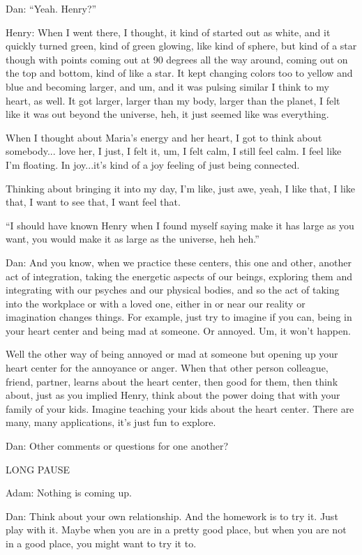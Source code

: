 \documentclass[12pt]{book}
\begin{document}
Dan: “Yeah. Henry?”
					
Henry: When I went there, I thought, it kind of started out as white, and it quickly turned green, kind of green glowing, like kind of sphere, but kind of a star though with points coming out at 90 degrees all the way around, coming out on the top and bottom, kind of like a star. It kept changing colors too to yellow and blue and becoming larger, and um, and it was pulsing similar I think to my heart, as well. It got larger, larger than my body, larger than the planet, I felt like it was out beyond the universe, heh, it just seemed like was everything.
					
When I thought about Maria’s energy and her heart, I got to think about somebody... love her, I just, I felt it, um, I felt calm, I still feel calm. I feel like I’m floating. In joy...it’s kind of a joy feeling of just being connected.

Thinking about bringing it into my day, I’m like, just awe, yeah, I like that, I like that, I want to see that, I want feel that.



``I should have known Henry when I found myself saying make it has large as you want,
you would make it as large as the universe, heh heh.''


Dan: And you know, when we practice these centers, this one and other, another act of integration, taking the energetic aspects of our beings, exploring them and integrating with our psyches and our physical bodies, and so the act of taking into the workplace or with a loved one, either in or near our reality or imagination changes things. For example, just try to imagine if you can, being in your heart center and being mad at someone. Or annoyed. Um, it won’t happen.
					
Well the other way of being annoyed or mad at someone but opening up your heart center for the annoyance or anger. When that other person colleague, friend, partner, learns about the heart center, then good for them, then think about, just as you implied Henry, think about the power doing that with your family of your kids. Imagine teaching your kids about the heart center. There are many, many applications, it’s just fun to explore.


Dan: Other comments or questions for one another?

LONG PAUSE

Adam: Nothing is coming up.

Dan: Think about your own relationship. And the homework is to try it. Just play with it. Maybe when you are in a pretty good place,
but when you are not in a good place, you might want to try it to.
\end{document}

